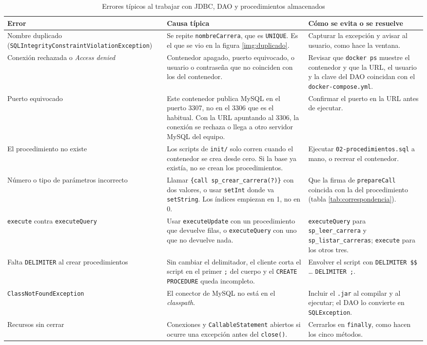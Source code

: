 \documentclass[10pt,a4paper]{article}
\begin{document}
\begin{table}[H]
	\centering
	\small
	\setlength{\tabcolsep}{4pt}
	\begin{tabular}{@{}>{\raggedright\arraybackslash}p{4.2cm}>{\raggedright\arraybackslash}p{6.0cm}>{\raggedright\arraybackslash}p{6.0cm}@{}}
		\toprule
		Error & Causa típica & Cómo se evita o se resuelve \\
		\midrule
		Nombre duplicado (\texttt{SQLIntegrity\allowbreak Constraint\allowbreak Violation\allowbreak Exception}) & Se repite \texttt{nombreCarrera}, que es \texttt{UNIQUE}. Es el que se vio en la figura \ref{img:duplicado}. & Capturar la excepción y avisar al usuario, como hace la ventana. \\
		Conexión rechazada o \textit{Access denied} & Contenedor apagado, puerto equivocado, o usuario o contraseña que no coinciden con los del contenedor. & Revisar que \texttt{docker ps} muestre el contenedor y que la URL, el usuario y la clave del DAO coincidan con el \texttt{docker-compose.yml}. \\
		Puerto equivocado & Este contenedor publica MySQL en el puerto 3307, no en el 3306 que es el habitual. Con la URL apuntando al 3306, la conexión se rechaza o llega a otro servidor MySQL del equipo. & Confirmar el puerto en la URL antes de ejecutar. \\
		El procedimiento no existe & Los scripts de \texttt{init/} solo corren cuando el contenedor se crea desde cero. Si la base ya existía, no se crean los procedimientos. & Ejecutar \texttt{02-procedimientos.sql} a mano, o recrear el contenedor. \\
		Número o tipo de parámetros incorrecto & Llamar \texttt{\{call sp\_crear\_carrera(?)\}} con dos valores, o usar \texttt{setInt} donde va \texttt{setString}. Los índices empiezan en 1, no en 0. & Que la firma de \texttt{prepareCall} coincida con la del procedimiento (tabla \ref{tab:correspondencia}). \\
		\texttt{execute} contra \texttt{executeQuery} & Usar \texttt{executeUpdate} con un procedimiento que devuelve filas, o \texttt{executeQuery} con uno que no devuelve nada. & \texttt{executeQuery} para \texttt{sp\_leer\_carrera} y \texttt{sp\_listar\_carreras}; \texttt{execute} para los otros tres. \\
		Falta \texttt{DELIMITER} al crear procedimientos & Sin cambiar el delimitador, el cliente corta el script en el primer \texttt{;} del cuerpo y el \texttt{CREATE PROCEDURE} queda incompleto. & Envolver el script con \texttt{DELIMITER \$\$} \dots{} \texttt{DELIMITER ;}. \\
		\texttt{ClassNotFoundException} & El conector de MySQL no está en el \textit{classpath}. & Incluir el \texttt{.jar} al compilar y al ejecutar; el DAO lo convierte en \texttt{SQLException}. \\
		Recursos sin cerrar & Conexiones y \texttt{CallableStatement} abiertos si ocurre una excepción antes del \texttt{close()}. & Cerrarlos en \texttt{finally}, como hacen los cinco métodos. \\
		\bottomrule
	\end{tabular}
	\caption{Errores típicos al trabajar con JDBC, DAO y procedimientos almacenados}
	\label{tab:errores}
\end{table}
\end{document}
